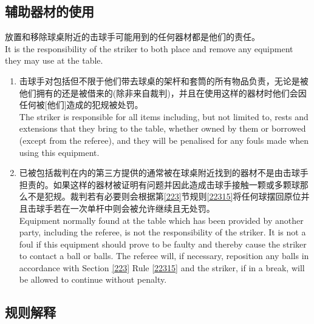 \subsection{辅助器材的使用}\label{22320}

\noindent 放置和移除球桌附近的击球手可能用到的任何器材都是他们的责任。\\
It is the responsibility of the striker to both place and remove any 
equipment they may use at the table.
\begin{enumerate}[label=(\alph*)]
    \item 击球手对包括但不限于他们带去球桌的架杆和套筒的所有物品负责，无论是被他们拥有的还是被借来的(除非来自裁判)，并且在使用这样的器材时他们会因任何被[他们]造成的犯规被处罚。\\
    The striker is responsible for all items including, but not limited to, rests and extensions that they bring to the table, whether owned by them or borrowed (except from the referee), and they will be penalised for any fouls made when using this equipment.
    \item \label{22320b}已被包括裁判在内的第三方提供的通常被在球桌附近找到的器材不是由击球手担责的。如果这样的器材被证明有问题并因此造成击球手接触一颗或多颗球那么不是犯规。裁判若有必要则会根据第\ref{223}节规则\ref{22315}将任何球摆回原位并且击球手若在一次单杆中则会被允许继续且无处罚。\\
    Equipment normally found at the table which has been provided by another party, including the referee, is not the responsibility of the striker. It is not a foul if this equipment should prove to be faulty and thereby cause the striker to contact a ball or balls. The referee will, if necessary, reposition any balls in accordance with Section \ref{223} Rule \ref{22315} and the striker, if in a break, will be allowed to continue without penalty.
\end{enumerate}

\subsection{规则解释}

